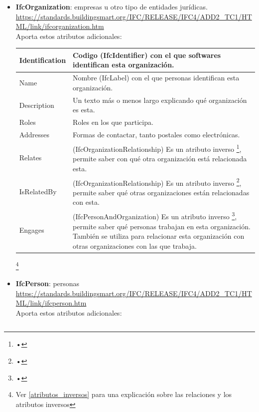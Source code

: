 \documentclass[spanish,12pt,a4paper,final,oneside]{book}
\begin{document}
\begin{itemize}

\item \textbf{IfcOrganization}: empresas u otro tipo de entidades jurídicas.
\\ \url{https://standards.buildingsmart.org/IFC/RELEASE/IFC4/ADD2_TC1/HTML/link/ifcorganization.htm}
\\Aporta estos atributos adicionales:
\\ \begin{longtable}{|p{2.5cm} p{11cm}|}
\hline

Identification & Codigo (IfcIdentifier) con el que softwares identifican esta organización.
\\[0.1cm] \hline

Name & Nombre (IfcLabel) con el que personas identifican esta organización.
\\[0.1cm] \hline

Description & Un texto más o menos largo explicando qué organización es esta.
\\[0.1cm] \hline

Roles & Roles en los que participa.
\\[0.1cm] \hline

Addresses & Formas de contactar, tanto postales como electrónicas.
\\[0.1cm] \hline

Relates & (IfcOrganizationRelationship) Es un atributo inverso \footnote{•}, permite saber con qué otra organización está relacionada esta.
\\[0.1cm] \hline

IsRelatedBy & (IfcOrganizationRelationship) Es un atributo inverso \footnote{•}, permite saber qué otras organizaciones están relacionadas con esta.
\\[0.1cm] \hline

Engages & (IfcPersonAndOrganization) Es un atributo inverso \footnote{•}, permite saber qué personas trabajan en esta organización. También se utiliza para relacionar esta organización con otras organizaciones con las que trabaja.
\\[0.1cm] \hline

\end{longtable}
\footnote{Ver \ref{atributos_inversos} para una explicación sobre las relaciones y los atributos inversos}



\item \textbf{IfcPerson}: personas
\\ \url{https://standards.buildingsmart.org/IFC/RELEASE/IFC4/ADD2_TC1/HTML/link/ifcperson.htm}
\\Aporta estos atributos adicionales:
\\ \begin{longtable}{|p{2.5cm} p{11cm}|}
\hline


\end{longtable}
\end{itemize}
\end{document}

